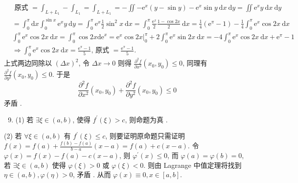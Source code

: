 \documentclass[10pt]{article}
\begin{document}
$$
\begin{aligned}
& \text { 原式 }=\int_{L+L_{1}}-\int_{L_{1}}=\int_{L+L_{1}}=-\iint-\mathrm{e}^{x}(y-\sin y)-\mathrm{e}^{x} \sin y \mathrm{~d} x \mathrm{~d} y=\iint \mathrm{e}^{x} y \mathrm{~d} x \mathrm{~d} y \\
& =\int_{0}^{\pi} \mathrm{d} x \int_{0}^{\sin x} \mathrm{e}^{x} y \mathrm{~d} y=\int_{0}^{\pi} \mathrm{e}^{x} \frac{1}{2} \sin ^{2} x \mathrm{~d} x=\int_{0}^{\pi} \frac{\mathrm{e}^{x}}{2} \frac{1-\cos 2 x}{2} \mathrm{~d} x=\frac{1}{4}\left(\mathrm{e}^{\pi}-1\right)-\frac{1}{4} \int_{0}^{\pi} \mathrm{e}^{x} \cos 2 x \mathrm{~d} x \\
& \int_{0}^{\pi} \mathrm{e}^{x} \cos 2 x \mathrm{~d} x=\int_{0}^{\pi} \cos 2 x \mathrm{de}^{x}=\left.\mathrm{e}^{x} \cos 2 x\right|_{0} ^{\pi}+2 \int_{0}^{\pi} \mathrm{e}^{x} \sin 2 x \mathrm{~d} x=-4 \int_{0}^{\pi} \mathrm{e}^{x} \cos 2 x \mathrm{~d} x+\mathrm{e}^{\pi}-1 \\
& \Longrightarrow \int_{0}^{\pi} \mathrm{e}^{x} \cos 2 x \mathrm{~d} x=\frac{\mathrm{e}^{\pi}-1}{5} \text {, 原式 }=\frac{\mathrm{e}^{\pi}-1}{5} \text {. } 
\end{aligned}
$$
 上式两边同除以  $(\Delta x)^{2}$,  令  $\Delta x \rightarrow 0$  则得  $\frac{\partial^{2} f}{\partial x^{2}}\left(x_{0}, y_{0}\right) \leqslant 0$,  同理有  $\frac{\partial^{2} f}{\partial y^{2}}\left(x_{0}, y_{0}\right) \leqslant 0$.  于是 
$$
\frac{\partial^{2} f}{\partial x^{2}}\left(x_{0}, y_{0}\right)+\frac{\partial^{2} f}{\partial y^{2}}\left(x_{0}, y_{0}\right) \leqslant 0
$$
 矛盾 .

\begin{enumerate}
  \setcounter{enumi}{8}
  \item (1)  若  $\exists \xi \in(a, b)$,  使得  $f^{\prime}(\xi)>c$,  则命题为真 .
\end{enumerate}
(2)  若  $\forall \xi \in(a, b)$  有  $f^{\prime}(\xi) \leqslant c$,  则要证明原命题只需证明  $f(x)=f(a)+\frac{f(b)-f(a)}{b-a}(x-a)=f(a)+c(x-a)$.  令  $\varphi(x)=f(x)-f(a)-c(x-a)$,  则  $\varphi^{\prime}(x) \leqslant 0$,  而  $\varphi(a)=\varphi(b)=0$,  若  $\exists \xi \in(a, b)$  使得  $\varphi(\xi)>0$  或  $\varphi(\xi)<0$.  则由  Lagrange  中值定理将找到  $\eta \in(a, b), \varphi(\eta)>0$,  矛盾 .  从而  $\varphi(x) \equiv 0, x \in[a, b]$.
\end{document}

